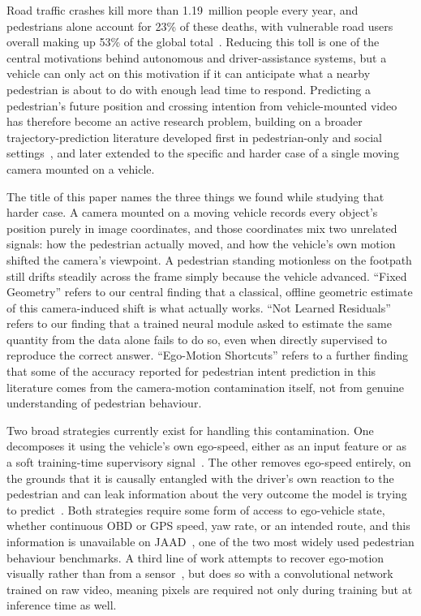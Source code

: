 \documentclass[conference]{IEEEtran}
\begin{document}
Road traffic crashes kill more than 1.19~million people every year, and
pedestrians alone account for 23\% of these deaths, with vulnerable road
users overall making up 53\% of the global total~\cite{who2023roadsafety}.
Reducing this toll is one of the central motivations behind autonomous and
driver-assistance systems, but a vehicle can only act on this motivation
if it can anticipate what a nearby pedestrian is about to do with enough
lead time to respond. Predicting a pedestrian's future position and
crossing intention from vehicle-mounted video has therefore become an
active research problem, building on a broader trajectory-prediction
literature developed first in pedestrian-only and social
settings~\cite{alahi2016sociallstm,gupta2018socialgan}, and later
extended to the specific and harder case of a single moving camera
mounted on a vehicle.

The title of this paper names the three things we found while studying
that harder case. A camera mounted on a moving vehicle records every
object's position purely in image coordinates, and those coordinates mix
two unrelated signals: how the pedestrian actually moved, and how the
vehicle's own motion shifted the camera's viewpoint. A pedestrian
standing motionless on the footpath still drifts steadily across the
frame simply because the vehicle advanced. ``Fixed Geometry'' refers to
our central finding that a classical, offline geometric estimate of this
camera-induced shift is what actually works. ``Not Learned Residuals''
refers to our finding that a trained neural module asked to estimate the
same quantity from the data alone fails to do so, even when directly
supervised to reproduce the correct answer. ``Ego-Motion Shortcuts''
refers to a further finding that some of the accuracy reported for
pedestrian intent prediction in this literature comes from the
camera-motion contamination itself, not from genuine understanding of
pedestrian behaviour.

Two broad strategies currently exist for handling this contamination.
One decomposes it using the vehicle's own ego-speed, either as an input
feature or as a soft training-time supervisory
signal~\cite{zhang2024decouple,czech2023behavior,peng2026trajmamba}. The
other removes ego-speed entirely, on the grounds that it is causally
entangled with the driver's own reaction to the pedestrian and can leak
information about the very outcome the model is trying to
predict~\cite{lim2025tits}. Both strategies require some form of access
to ego-vehicle state, whether continuous OBD or GPS speed, yaw rate, or
an intended route, and this information is unavailable on
JAAD~\cite{kotseruba2017jaad}, one of the two most widely used
pedestrian behaviour benchmarks. A third line of work attempts to
recover ego-motion visually rather than from a
sensor~\cite{neumann2021pedestrian}, but does so with a convolutional
network trained on raw video, meaning pixels are required not only
during training but at inference time as well.
\end{document}
